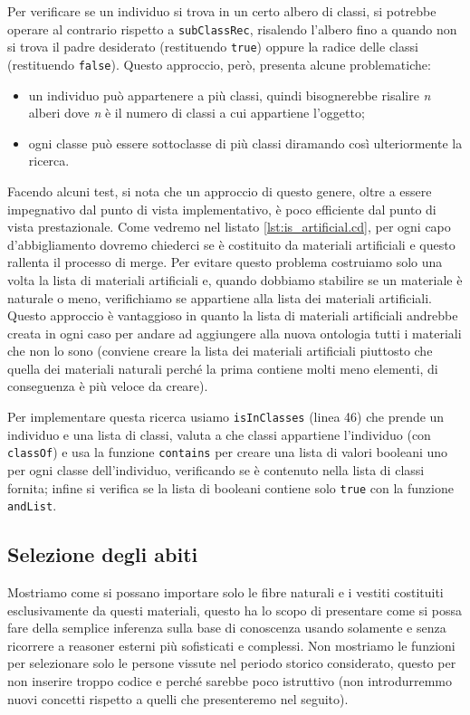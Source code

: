 Per verificare se un individuo si trova in un certo albero di classi, si potrebbe operare al contrario rispetto a \verb|subClassRec|, risalendo l'albero fino a quando non si trova il padre desiderato (restituendo \verb|true|) oppure la radice delle classi (restituendo \verb|false|). Questo approccio, però, presenta alcune problematiche:
\begin{itemize}
	\item un individuo può appartenere a più classi, quindi bisognerebbe risalire \emph{n} alberi dove \emph{n} è il numero di classi a cui appartiene l'oggetto;
	\item ogni classe può essere sottoclasse di più classi diramando così ulteriormente la ricerca.
\end{itemize}
Facendo alcuni test, si nota che un approccio di questo genere, oltre a essere impegnativo dal punto di vista implementativo, è poco efficiente dal punto di vista prestazionale. Come vedremo nel listato \ref{lst:is_artificial.cd}, per ogni capo d'abbigliamento dovremo chiederci se è costituito da materiali artificiali e questo rallenta il processo di merge. Per evitare questo problema costruiamo solo una volta la lista di materiali artificiali e, quando dobbiamo stabilire se un materiale è naturale o meno, verifichiamo se appartiene alla lista dei materiali artificiali. Questo approccio è vantaggioso in quanto la lista di materiali artificiali andrebbe creata in ogni caso per andare ad aggiungere alla nuova ontologia tutti i materiali che non lo sono (conviene creare la lista dei materiali artificiali piuttosto che quella dei materiali naturali perché la prima contiene molti meno elementi, di conseguenza è più veloce da creare).

Per implementare questa ricerca usiamo \verb|isInClasses| (linea 46) che prende un individuo e una lista di classi, valuta a che classi appartiene l'individuo (con \verb|classOf|) e usa la funzione \verb|contains| per creare una lista di valori booleani uno per ogni classe dell'individuo, verificando se è contenuto nella lista di classi fornita; infine si verifica se la lista di booleani contiene solo \verb|true| con la funzione \verb|andList|.

\subsection{Selezione degli abiti}
Mostriamo come si possano importare solo le fibre naturali e i vestiti costituiti esclusivamente da questi materiali, questo ha lo scopo di presentare come si possa fare della semplice inferenza sulla base di conoscenza usando solamente \cduce e senza ricorrere a reasoner esterni più sofisticati e complessi. Non mostriamo le funzioni per selezionare solo le persone vissute nel periodo storico considerato, questo per non inserire troppo codice e perché sarebbe poco istruttivo (non introdurremmo nuovi concetti rispetto a quelli che presenteremo nel seguito).

